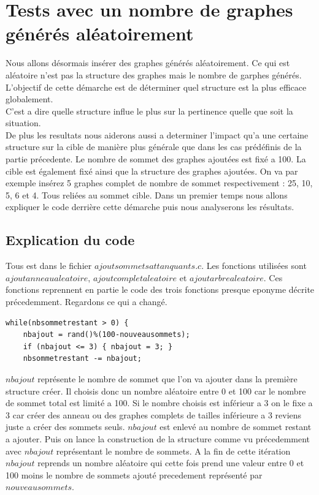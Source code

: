 \documentclass[a4paper,11pt]{article}
\begin{document}
\section{Tests avec un nombre de graphes générés aléatoirement}
	Nous allons désormais insérer des graphes générés aléatoirement. Ce qui est aléatoire n'est pas la structure des graphes mais le nombre de garphes générés.\\
	L'objectif de cette démarche est de déterminer quel structure est la plus efficace globalement.\\
	C'est a dire quelle structure influe le plus sur la pertinence quelle que soit la situation.\\
	De plus les resultats nous aiderons aussi a determiner l'impact qu'a une certaine structure sur la cible de manière plus générale 
	que dans les cas prédéfinis de la partie précedente.
	Le nombre de sommet des graphes ajoutées est fixé a 100.
	La cible est également fixé ainsi que la structure des graphes ajoutées.
	On va par exemple insérez 5 graphes complet de nombre de sommet respectivement : 25, 10, 5, 6 et 4. Tous reliées au sommet cible.
	Dans un premier temps nous allons expliquer le code derrière cette démarche puis nous analyserons les résultats.

	\subsection{Explication du code}
		Tous est dans le fichier $ajoutsommetsattanquants.c$. Les fonctions utilisées sont $ajoutanneaualeatoire$, $ajoutcompletaleatoire$
		et $ajoutarbrealeatoire$. Ces fonctions reprennent en partie le code des trois fonctions presque eponyme décrite précedemment.
		Regardons ce qui a changé. 
		\begin{lstlisting}
while(nbsommetrestant > 0) {
	nbajout = rand()%(100-nouveausommets);
	if (nbajout <= 3) { nbajout = 3; }
	nbsommetrestant -= nbajout;
		\end{lstlisting}
		$nbajout$ représente le nombre de sommet que l'on va ajouter dans la première structure créer. Il choisis donc un nombre 
		aléatoire entre 0 et 100 car le nombre de sommet total est limité a 100. Si le nombre choisis est inférieur a 3 on le fixe a 3 car créer
		des anneau ou des graphes complets de tailles inférieure a 3 reviens juste a créer des sommets seuls.
		$nbajout$ est enlevé au nombre de sommet restant a ajouter. Puis on lance la construction de la structure comme vu précedemment 
		avec $nbajout$ représentant le nombre de sommets. A la fin de cette itération $nbajout$ reprends un nombre aléatoire qui cette fois
		prend une valeur entre 0 et 100 moins le nombre de sommets ajouté precedement représenté par $nouveausommets$.
\end{document}
